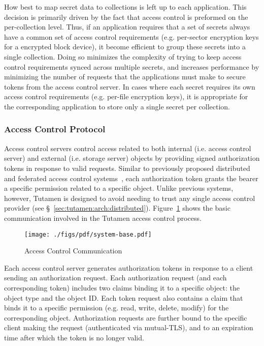How best to map secret data to collections is left up to each
application. This decision is primarily driven by the fact that access
control is preformed on the per-collection level. Thus, if an
application requires that a set of secrets always have a common set of
access control requirements (e.g. per-sector encryption keys for a
encrypted block device), it become efficient to group these secrets
into a single collection. Doing so minimizes the complexity of trying
to keep access control requirements synced across multiple secrets,
and increases performance by minimizing the number of requests that
the applications must make to secure tokens from the access control
server. In cases where each secret requires its own access control
requirements (e.g. per-file encryption keys), it is appropriate for
the corresponding application to store only a single secret per
collection.

\subsubsection{Access Control Protocol}
\label{sec:tutamen:arch:acp}

Access control servers control access related to both internal
(i.e. access control server) and external (i.e. storage server)
objects by providing signed authorization tokens in response to valid
requests. Similar to previously proposed distributed and federated
access control systems~\cite{Calero2010, Leandro2012},
each authorization token grants the bearer a specific permission
related to a specific object. Unlike previous systems, however,
Tutamen is designed to avoid needing to trust any single access
control provider (see \S~\ref{sec:tutamen:arch:distributed}).
Figure~\ref{fig:tutamen:systembase} shows the basic communication
involved in the Tutamen access control process.

\begin{figure}[th]
  \centering
  \texttt{[image: ./figs/pdf/system-base.pdf]}
  \caption{Access Control Communication}
  \label{fig:tutamen:systembase}
\end{figure}

Each access control server generates authorization tokens in response
to a client sending an authorization request. Each authorization
request (and each corresponding token) includes two claims binding it
to a specific object: the object type and the object ID. Each token
request also contains a claim that binds it to a specific permission
(e.g. read, write, delete, modify) for the corresponding
object. Authorization requests are further bound to the specific
client making the request (authenticated via mutual-TLS), and to an
expiration time after which the token is no longer valid.

